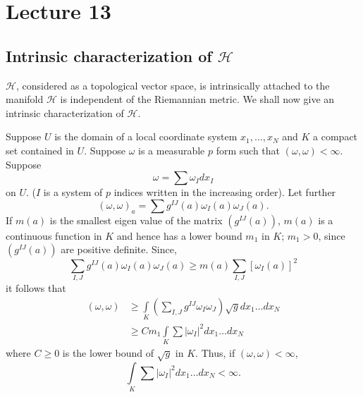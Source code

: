 \chapter{Lecture 13}

\section*{Intrinsic characterization of $\mathscr{H}$}\pageoriginale

$\mathscr{H}$, considered as a topological vector space, is
intrinsically attached to the manifold \iec $\mathscr{H}$ is
independent of the Riemannian metric. We shall now give an intrinsic
characterization of $\mathscr{H}$.

Suppose $U$ is the domain of a local coordinate system
$x_{1},\ldots,x_{N}$ and $K$ a compact set contained in $U$. Suppose
$\omega$ is a measurable $p$ form such that
$(\omega,\omega)<\infty$. Suppose
$$
\omega=\sum \omega_{I}dx_{I}
$$
on $U$. ($I$ is a system of $p$ indices written in the increasing
order). Let further
$$
(\omega,\omega)_{a}=\sum g^{IJ}(a)\omega_{I}(a)\omega_{J}(a).
$$
If $m(a)$ is the smallest eigen value of the matrix $(g^{IJ}(a))$,
$m(a)$ is a continuous function in $K$ and hence has a lower bound $m_1$
in $K$; $m_{1}>0$, since $(g^{IJ}(a))$ are positive definite. Since,
$$
\sum_{I,J}g^{IJ}(a)\omega_{I}(a)\omega_{J}(a)\geq
m(a)\sum_{I,J}[\omega_{I}(a)]^{2} 
$$
it follows that
\begin{align*}
(\omega,\omega) &\geq
  \int\limits_{K}\left(\sum_{I,J}g^{IJ}\omega_{I}\omega_{J}\right)\sqrt{g}dx_{1}\ldots
  dx_{N}\\
&\geq Cm_{1}\int\limits_{K}\sum |\omega_{I}|^{2}dx_{1}\ldots dx_{N}
\end{align*}
where $C\geq 0$ is the lower bound of $\sqrt{g}$ in $K$. Thus, if
$(\omega,\omega)<\infty$, 
$$
\int\limits_{K}\sum|\omega_{I}|^{2}dx_{1}\ldots dx_{N}<\infty.
$$\pageoriginale

